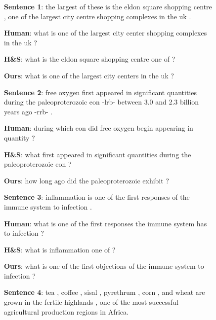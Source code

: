 \documentclass[11pt,a4paper]{article}
\begin{document}
\begin{figure}[!tb]
\begin{framed}
\small
  \noindent \textbf{Sentence 1}: the largest of these is the eldon square shopping centre , one of the largest city centre shopping complexes in the uk . 
  
  \vspace{0.02cm}\noindent \textbf{Human}: what is one of the largest city center shopping complexes in the uk ?
  
  \vspace{0.02cm} \noindent \textbf{H\&S}: what is the eldon square shopping centre one of ?
 
  \vspace{0.02cm} \noindent \textbf{Ours}: what is one of the largest city centers in the uk ?
  
  \par 
  \vspace{0.4cm} 
  \noindent \textbf{Sentence 2}: free oxygen first appeared in significant quantities during the paleoproterozoic eon -lrb- between 3.0 and 2.3 billion years ago -rrb- .  
  
  \vspace{0.02cm}\noindent \textbf{Human}: during which eon did free oxygen begin appearing in quantity ?
  
  \vspace{0.02cm} \noindent \textbf{H\&S}: what first appeared in significant quantities during the paleoproterozoic eon ?
  
  \vspace{0.02cm} \noindent \textbf{Ours}: how long ago did the paleoproterozoic exhibit ?
  
  \par 
  \vspace{0.4cm} 
  \noindent \textbf{Sentence 3}: inflammation is one of the first responses of the immune system to infection . 
  
  \vspace{0.02cm}\noindent \textbf{Human}: what is one of the first responses the immune system has to infection ?
  
  \vspace{0.02cm} \noindent \textbf{H\&S}: what is inflammation one of ?
  
  \vspace{0.02cm} \noindent \textbf{Ours}: what is one of the first objections of the immune system to infection ?
  
  \par 
  \vspace{0.4cm} 
  \noindent \textbf{Sentence 4}: tea , coffee , sisal , pyrethrum , corn , and wheat are grown in the fertile highlands , one of the most successful agricultural production regions in Africa.
  

\end{framed}
\end{figure}
\end{document}

